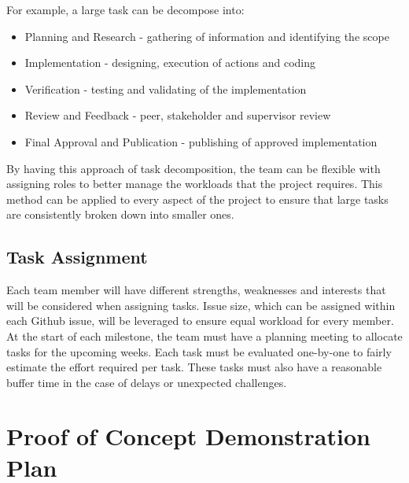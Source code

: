 \documentclass{article}
\begin{document}
\vspace*{10pt}

\noindent For example, a large task can be decompose into:

\begin{itemize}
  \item Planning and Research - gathering of information and identifying the scope
  \item Implementation - designing, execution of actions and coding
  \item Verification - testing and validating of the implementation
  \item Review and Feedback - peer, stakeholder and supervisor review
  \item Final Approval and Publication - publishing of approved implementation
\end{itemize}

\noindent By having this approach of task decomposition, the team can be flexible with assigning roles to better manage the workloads that the project requires. This method can be applied to every aspect of the project to ensure that large tasks are consistently broken down into smaller ones.

\subsection{Task Assignment}
Each team member will have different strengths, weaknesses and interests that will be considered when assigning tasks. Issue size, which can be assigned within each Github issue, will be leveraged to ensure equal workload for every member. At the start of each milestone, the team must have a planning meeting to allocate tasks for the upcoming weeks. Each task must be evaluated one-by-one to fairly estimate the effort required per task. These tasks must also have a reasonable buffer time in the case of delays or unexpected challenges.

\section{Proof of Concept Demonstration Plan}

\end{document}
